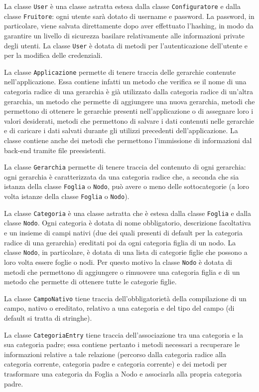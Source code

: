 La classe \texttt{User} è una classe astratta estesa dalla classe \texttt{Configuratore} e dalla classe \texttt{Fruitore}: ogni utente sarà dotato di username e password. La password, in particolare, viene salvata direttamente dopo aver effettuato l'hashing, in modo da garantire un livello di sicurezza basilare relativamente alle informazioni private degli utenti. La classe \texttt{User} è dotata di metodi per l'autenticazione dell'utente e per la modifica delle credenziali.

La classe \texttt{Applicazione} permette di tenere traccia delle gerarchie contenute nell'applicazione. 
Essa contiene infatti un metodo che verifica se il nome di una categoria radice di una gerarchia è già utilizzato dalla categoria radice di un'altra gerarchia, un metodo che permette di aggiungere una nuova gerarchia, metodi che permettono di ottenere le gerarchie presenti nell'applicazione o di assegnare loro i valori desiderati, metodi che permettono di salvare i dati contenuti nelle gerarchie e di caricare i dati salvati durante gli utilizzi precedenti dell'applicazione. 
La classe contiene anche dei metodi che permettono l'immissione di informazioni dal back-end tramite file preesistenti. 

La classe \texttt{Gerarchia} permette di tenere traccia del contenuto di ogni gerarchia: ogni gerarchia è caratterizzata da una categoria radice che, a seconda che sia istanza della classe \texttt{Foglia} o \texttt{Nodo}, può avere o meno delle sottocategorie (a loro volta istanze della classe \texttt{Foglia} o \texttt{Nodo}). 

La classe \texttt{Categoria} è una classe astratta che è estesa dalla classe \texttt{Foglia} e dalla classe \texttt{Nodo}. Ogni categoria è dotata di nome obbligatorio, descrizione facoltativa e un insieme di campi nativi (due dei quali presenti di default per la categoria radice di una gerarchia) ereditati poi da ogni categoria figlia di un nodo.
La classe \texttt{Nodo}, in particolare, è dotata di una lista di categorie figlie che possono a loro volta essere foglie o nodi. Per questo motivo la classe \texttt{Nodo} è dotata di metodi che permettono di aggiungere o rimuovere una categoria figlia e di un metodo che permette di ottenere tutte le categorie figlie.

La classe \texttt{CampoNativo} tiene traccia dell'obbligatorietà della compilazione di un campo, nativo o ereditato, relativo a una categoria e del tipo del campo (di default si tratta di stringhe). 

La classe \texttt{CategoriaEntry} tiene traccia dell'associazione tra una categoria e la sua categoria padre; essa contiene pertanto i metodi necessari a recuperare le informazioni relative a tale relazione (percorso dalla categoria radice alla categoria corrente, categoria padre e categoria corrente) e dei metodi per trasformare una categoria da Foglia a Nodo e associarla alla propria categoria padre.

